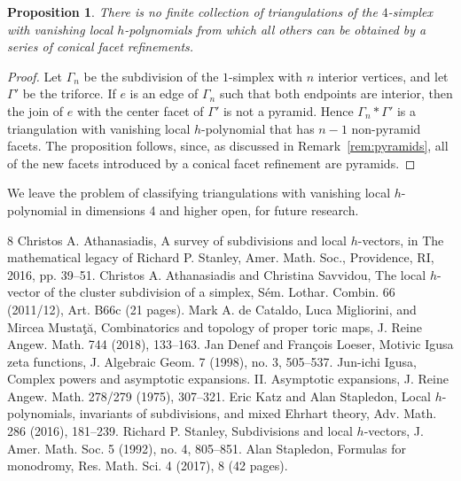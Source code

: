 \documentclass[10pt]{amsart}
\newtheorem{prop}[theorem]{Proposition}
\begin{document}
\begin{prop}
There is no finite collection of triangulations of the $4$-simplex with vanishing local $h$-polynomials from which all others can be obtained by a series of conical facet refinements.
\end{prop}

\begin{proof}
Let $\Gamma_n$ be the subdivision of the $1$-simplex with $n$ interior vertices, and let $\Gamma'$ be the triforce. If $e$ is an edge of $\Gamma_n$ such that both endpoints are interior, then the join of $e$ with the center facet of $\Gamma'$ is not a pyramid. Hence $\Gamma_n * \Gamma'$ is a triangulation with vanishing local $h$-polynomial that has $n-1$ non-pyramid facets. The proposition follows, since, as discussed in Remark~\ref{rem:pyramids}, all of the new facets introduced by a conical facet refinement are pyramids.
\end{proof}


\noindent We leave the problem of classifying triangulations with vanishing local $h$-polynomial in dimensions 4 and higher open, for future research.



 

\begin{thebibliography}{8}
 Christos A. Athanasiadis, A survey of subdivisions and local $h$-vectors, in The mathematical legacy of Richard P. Stanley, Amer. Math. Soc., Providence, RI, 2016, pp. 39--51.
 Christos A. Athanasiadis and Christina Savvidou, The local $h$-vector of the cluster subdivision of a simplex, S\'em. Lothar. Combin. 66 (2011/12), Art. B66c (21 pages).
 Mark A. de Cataldo, Luca Migliorini, and Mircea Musta\c{t}\u{a}, Combinatorics and topology of proper toric maps, J. Reine Angew. Math. 744 (2018), 133--163.
 Jan Denef and Fran\c{c}ois Loeser, Motivic Igusa zeta functions, J. Algebraic Geom. 7 (1998), no. 3, 505--537.
 Jun-ichi Igusa, Complex powers and asymptotic expansions. II. Asymptotic expansions, J. Reine Angew. Math. 278/279 (1975), 307--321.
 Eric Katz and Alan Stapledon, Local $h$-polynomials, invariants of subdivisions, and mixed Ehrhart theory, Adv. Math. 286 (2016), 181--239.
 Richard P. Stanley, Subdivisions and local $h$-vectors, J. Amer. Math. Soc. 5 (1992), no. 4, 805--851.
 Alan Stapledon, Formulas for monodromy, Res. Math. Sci. 4 (2017), 8 (42 pages).
\end{thebibliography}
\end{document}
